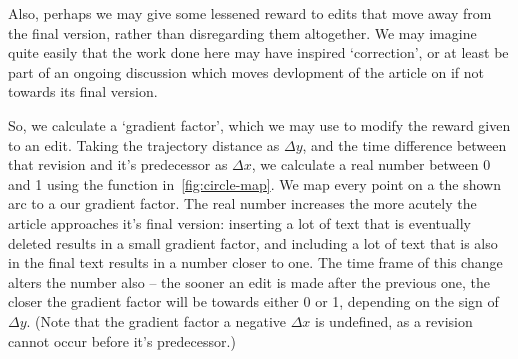 Also, perhaps we may give some lessened reward to edits that move away
from the final version, rather than disregarding them altogether. We
may imagine quite easily that the work done here may have inspired
`correction', or at least be part of an ongoing discussion which moves
devlopment of the article on if not towards its final version. %


So, we calculate a `gradient factor', which we may use to modify the
reward given to an edit. Taking the trajectory distance as $\Delta y$,
and the time difference between that revision and it's predecessor as
$\Delta x$, we calculate a real number between 0 and 1 using the
function in~\ref{fig:circle-map}. We map every point on a the shown
arc to a our gradient factor. The real number increases the more
acutely the article approaches it's final version: inserting a lot of
text that is eventually deleted results in a small gradient factor,
and including a lot of text that is also in the final text results in
a number closer to one. The time frame of this change alters the
number also -- the sooner an edit is made after the previous one, the
closer the gradient factor will be towards either 0 or 1, depending on
the sign of $\Delta y$. (Note that the gradient factor a negative
$\Delta x$ is undefined, as a revision cannot occur before it's
predecessor.)

